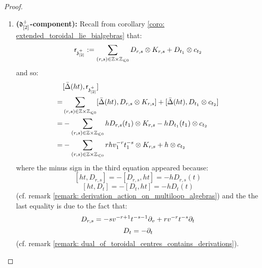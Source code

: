 \begin{proof}
\begin{enumerate}
\begin{enumerate}
                        \item \textbf{($\mathfrak{d}_{[2]}^{+}$-component):} Recall from corollary \ref{coro: extended_toroidal_lie_bialgebras} that:
                            $$\sfr_{\z_{[2]}^{\positive}} := \sum_{(r, s) \in \Z \x \Z_{\leq 0}} D_{r, s} \tensor K_{r, s} + D_{t_1} \tensor c_{t_2}$$
                        and so:
                            $$
                                \begin{aligned}
                                    & [\bar{\Delta}(ht), \sfr_{\z_{[2]}^{\positive}}]
                                    \\
                                    = & \sum_{(r, s) \in \Z \x \Z_{\leq 0}} [\bar{\Delta}(ht), D_{r, s} \tensor K_{r, s}] + [\bar{\Delta}(ht), D_{t_1} \tensor c_{t_2}]
                                    \\
                                    = & -\sum_{(r, s) \in \Z \x \Z_{\leq 0}} h D_{r, s}(t_1) \tensor K_{r, s} - h D_{t_1}(t_1) \tensor c_{t_2}
                                    \\
                                    = & -\sum_{(r, s) \in \Z \x \Z_{\leq 0}} r h v_1^{-r} t_1^{-s} \tensor K_{r, s} + h \tensor c_{t_2}
                                \end{aligned}
                            $$
                        where the minus sign in the third equation appeared because:
                            $$[ht, D_{r, s}] = -[D_{r, s}, ht] = -h D_{r, s}(t)$$
                            $$[ht, D_t] = -[D_t, ht] = -h D_t(t)$$
                        (cf. remark \ref{remark: derivation_action_on_multiloop_algebras}) and the the last equality is due to the fact that:
                            $$D_{r, s} = -s v^{-r + 1} t^{-s - 1} \partial_v + r v^{-r} t^{-s} \partial_t$$
                            $$D_t = -\partial_t$$
                        (cf. remark \ref{remark: dual_of_toroidal_centres_contains_derivations}). 
                    \end{enumerate}


\end{enumerate}
\end{proof}
